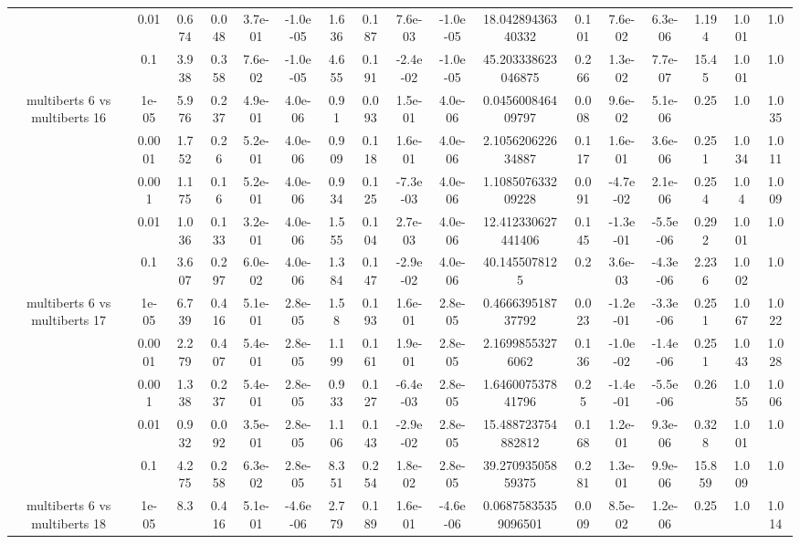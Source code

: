 \begin{tabular}{|c|c|c|c|c|c|c|c|c|c|c|c|c|c|c|c|c|}
 & 0.01 & 0.674 & 0.048 & 3.7e-01 & -1.0e-05 & 1.636 & 0.187 & 7.6e-03 & -1.0e-05 & 18.04289436340332 & 0.101 & 7.6e-02 & 6.3e-06 & 1.194 & 1.001 & 1.0 \\
 & 0.1 & 3.938 & 0.358 & 7.6e-02 & -1.0e-05 & 4.655 & 0.191 & -2.4e-02 & -1.0e-05 & 45.203338623046875 & 0.266 & 1.3e-02 & 7.7e-07 & 15.45 & 1.001 & 1.0 \\
\hline
\multirow{5}{*}{multiberts 6 vs multiberts 16} & 1e-05 & 5.976 & 0.237 & 4.9e-01 & 4.0e-06 & 0.91 & 0.093 & 1.5e-01 & 4.0e-06 & 0.045600846409797 & 0.008 & 9.6e-02 & 5.1e-06 & 0.25 & 1.0 & 1.035 \\
 & 0.0001 & 1.752 & 0.26 & 5.2e-01 & 4.0e-06 & 0.909 & 0.118 & 1.6e-01 & 4.0e-06 & 2.105620622634887 & 0.117 & 1.6e-01 & 3.6e-06 & 0.251 & 1.034 & 1.011 \\
 & 0.001 & 1.175 & 0.16 & 5.2e-01 & 4.0e-06 & 0.934 & 0.125 & -7.3e-03 & 4.0e-06 & 1.108507633209228 & 0.091 & -4.7e-02 & 2.1e-06 & 0.254 & 1.04 & 1.009 \\
 & 0.01 & 1.036 & 0.133 & 3.2e-01 & 4.0e-06 & 1.555 & 0.104 & 2.7e-03 & 4.0e-06 & 12.412330627441406 & 0.145 & -1.3e-01 & -5.5e-06 & 0.292 & 1.001 & 1.0 \\
 & 0.1 & 3.607 & 0.297 & 6.0e-02 & 4.0e-06 & 1.384 & 0.147 & -2.9e-02 & 4.0e-06 & 40.1455078125 & 0.2 & 3.6e-03 & -4.3e-06 & 2.236 & 1.002 & 1.0 \\
\hline
\multirow{5}{*}{multiberts 6 vs multiberts 17} & 1e-05 & 6.739 & 0.416 & 5.1e-01 & 2.8e-05 & 1.58 & 0.193 & 1.6e-01 & 2.8e-05 & 0.466639518737792 & 0.023 & -1.2e-01 & -3.3e-06 & 0.251 & 1.067 & 1.022 \\
 & 0.0001 & 2.279 & 0.407 & 5.4e-01 & 2.8e-05 & 1.199 & 0.161 & 1.9e-01 & 2.8e-05 & 2.16998553276062 & 0.136 & -1.0e-02 & -1.4e-06 & 0.251 & 1.043 & 1.028 \\
 & 0.001 & 1.338 & 0.237 & 5.4e-01 & 2.8e-05 & 0.933 & 0.127 & -6.4e-03 & 2.8e-05 & 1.646007537841796 & 0.25 & -1.4e-01 & -5.5e-06 & 0.26 & 1.055 & 1.006 \\
 & 0.01 & 0.932 & 0.092 & 3.5e-01 & 2.8e-05 & 1.106 & 0.143 & -2.9e-02 & 2.8e-05 & 15.488723754882812 & 0.168 & 1.2e-01 & 9.3e-06 & 0.328 & 1.001 & 1.0 \\
 & 0.1 & 4.275 & 0.258 & 6.3e-02 & 2.8e-05 & 8.351 & 0.254 & 1.8e-02 & 2.8e-05 & 39.27093505859375 & 0.281 & 1.3e-01 & 9.9e-06 & 15.859 & 1.009 & 1.0 \\
\hline
\multirow{5}{*}{multiberts 6 vs multiberts 18} & 1e-05 & 8.3 & 0.416 & 5.1e-01 & -4.6e-06 & 2.779 & 0.189 & 1.6e-01 & -4.6e-06 & 0.06875835359096501 & 0.009 & 8.5e-02 & 1.2e-06 & 0.25 & 1.0 & 1.014 \\

\end{tabular}
